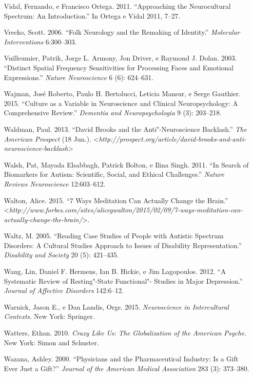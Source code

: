 Vidal, Fernando, e Francisco Ortega. 2011. ``Approaching the
Neurocultural Spectrum: An Introduction.'' In Ortega e Vidal 2011,
7--27.

Vrecko, Scott. 2006. ``Folk Neurology and the Remaking of Identity.''
\emph{Molecular Interventions} 6:300--303.

Vuilleumier, Patrik, Jorge L. Armony, Jon Driver, e Raymond J. Dolan.
2003. ``Distinct Spatial Frequency Sensitivities for Processing Faces
and Emotional Expressions.'' \emph{Nature Neuroscience} 6 (6): 624--631.

Wajman, José Roberto, Paulo H. Bertolucci, Leticia Mansur, e Serge
Gauthier. 2015. ``Culture as a Variable in Neuroscience and Clinical
Neuropsychology: A Comprehensive Review.'' \emph{Dementia and
Neuropsychologia} 9 (3): 203--218.

Waldman, Paul. 2013. ``David Brooks and the Anti"-Neuroscience
Backlash.'' \emph{The American Prospect} (18 Jun.).
\textless{}\emph{http://prospect.org/article/david-brooks-and-anti-neuroscience-backlash}\textgreater{}

Walsh, Pat, Mayada Elsabbagh, Patrick Bolton, e Ilina Singh. 2011. ``In
Search of Biomarkers for Autism: Scientific, Social, and Ethical
Challenges.'' \emph{Nature Reviews Neuroscience} 12:603--612.

Walton, Alice. 2015. ``7 Ways Meditation Can Actually Change the
Brain.''
\textless{}\emph{http://www.forbes.com/sites/alicegwalton/2015/02/09/7-ways-meditation-can-actually-change-the-brain/}\textgreater{}.

Waltz, M. 2005. ``Reading Case Studies of People with Autistic Spectrum
Disorders: A Cultural Studies Approach to Issues of Disability
Representation.'' \emph{Disability and Society} 20 (5): 421--435.

Wang, Lin, Daniel F. Hermens, Ian B. Hickie, e Jim Lagopoulos. 2012. ``A
Systematic Review of Resting"-State Functional"- Studies in Major
Depression.'' \emph{Journal of Affective Disorders} 142:6--12.

Warnick, Jason E., e Dan Landis, Orgs. 2015. \emph{Neuroscience in
Intercultural Contexts}. New York: Springer.

Watters, Ethan. 2010. \emph{Crazy Like Us: The Globalization of the
American Psyche.} New York: Simon and Schuster.

Wazana, Ashley. 2000. ``Physicians and the Pharmaceutical Industry: Is a
Gift Ever Just a Gift?'' \emph{Journal of the American Medical
Association} 283 (3): 373--380.

